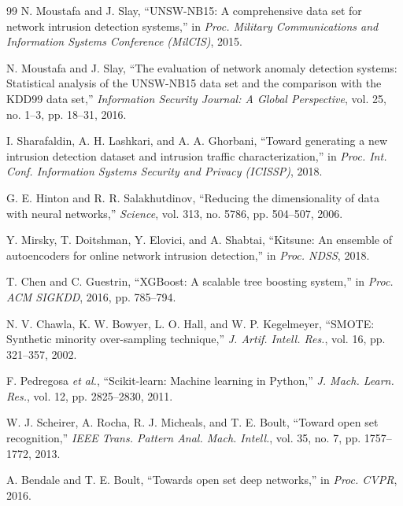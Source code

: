 \begin{thebibliography}{99}
N. Moustafa and J. Slay, ``UNSW-NB15: A comprehensive data set for network intrusion detection systems,'' in \emph{Proc. Military Communications and Information Systems Conference (MilCIS)}, 2015.

N. Moustafa and J. Slay, ``The evaluation of network anomaly detection systems: Statistical analysis of the UNSW-NB15 data set and the comparison with the KDD99 data set,'' \emph{Information Security Journal: A Global Perspective}, vol. 25, no. 1--3, pp. 18--31, 2016.

I. Sharafaldin, A. H. Lashkari, and A. A. Ghorbani, ``Toward generating a new intrusion detection dataset and intrusion traffic characterization,'' in \emph{Proc. Int. Conf. Information Systems Security and Privacy (ICISSP)}, 2018.

G. E. Hinton and R. R. Salakhutdinov, ``Reducing the dimensionality of data with neural networks,'' \emph{Science}, vol. 313, no. 5786, pp. 504--507, 2006.

Y. Mirsky, T. Doitshman, Y. Elovici, and A. Shabtai, ``Kitsune: An ensemble of autoencoders for online network intrusion detection,'' in \emph{Proc. NDSS}, 2018.

T. Chen and C. Guestrin, ``XGBoost: A scalable tree boosting system,'' in \emph{Proc. ACM SIGKDD}, 2016, pp. 785--794.

N. V. Chawla, K. W. Bowyer, L. O. Hall, and W. P. Kegelmeyer, ``SMOTE: Synthetic minority over-sampling technique,'' \emph{J. Artif. Intell. Res.}, vol. 16, pp. 321--357, 2002.

F. Pedregosa \emph{et al.}, ``Scikit-learn: Machine learning in Python,'' \emph{J. Mach. Learn. Res.}, vol. 12, pp. 2825--2830, 2011.

W. J. Scheirer, A. Rocha, R. J. Micheals, and T. E. Boult, ``Toward open set recognition,'' \emph{IEEE Trans. Pattern Anal. Mach. Intell.}, vol. 35, no. 7, pp. 1757--1772, 2013.

A. Bendale and T. E. Boult, ``Towards open set deep networks,'' in \emph{Proc. CVPR}, 2016.


\end{thebibliography}
